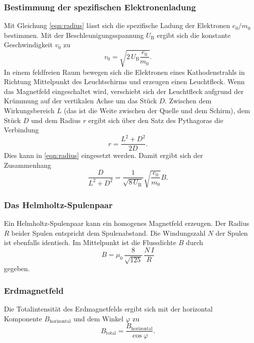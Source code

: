 \subsubsection{Bestimmung der spezifischen Elektronenladung}
Mit Gleichung \ref{eqn:radius} lässt sich die spezifische 
Ladung der Elektronen $e_\text{0}/m_\text{0}$ bestimmen. 
Mit der Beschleunigungsspannung $U_\text{B}$ ergibt sich die 
konstante Geschwindigkeit $v_\text{0}$ zu 
\begin{equation*}
    v_\text{0}= \sqrt{2 \, U_\text{B} \frac{e_\text{0}}{m_\text{0}}}.
\end{equation*}
In einem feldfreien Raum bewegen sich die Elektronen eines 
Kathodenstrahls in Richtung Mittelpunkt des Leuchtschirms und 
erzeugen einen Leuchtfleck. 
Wenn das Magnetfeld eingeschaltet wird, verschiebt sich 
der Leuchtfleck aufgrund der Krümmung auf der vertikalen Achse 
um das Stück $D$. Zwischen dem Wirkungsbereich $L$ (das ist die Weite 
zwischen der Quelle und dem Schirm), dem Stück $D$ und dem 
Radius $r$ ergibt sich über den Satz des Pythagoras die 
Verbindung
\begin{equation*}
    r = \frac{L^2 + D^2}{2D}.
\end{equation*}
Dies kann in \ref{eqn:radius} eingesetzt werden.
Damit ergibt sich der Zusammenhang
\begin{equation}
    \frac{D}{L^2 + D^2}= \frac{1}{\sqrt{8 \, U_\text{B}}}\sqrt{\frac{e_\text{0}}{m_\text{0}}} B.
    \label{eqn:Ende}
\end{equation}

\subsubsection{Das Helmholtz-Spulenpaar}
Ein Helmholtz-Spulenpaar kann ein homogenes Magnetfeld erzeugen.
Der Radius $R$ beider Spulen entspricht dem Spulenabstand.
Die Windungszahl $N$ der Spulen ist ebenfalls identisch.
Im Mittelpunkt ist die Flussdichte $B$ durch
\begin{equation}
    B = \mu_0 \, \frac{8}{\sqrt{125}} \, \frac{N \, I}{R}
    \label{eqn:helmholtz}
\end{equation}
gegeben.

\subsubsection{Erdmagnetfeld}
Die Totalintensität des Erdmagnetfelds ergibt sich mit der horizontal Komponente $B_\text{horizontal}$ und dem Winkel $\varphi$ zu %
\begin{equation}
    B_\text{total} = \frac{B_\text{horizontal}}{\cos{\varphi}}.
    \label{eqn:btotal}
\end{equation}
